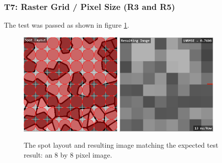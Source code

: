 \documentclass[12pt, titlepage]{article}
\begin{document}
\subsubsection{T7: Raster Grid / Pixel Size (R3 and R5)}
The test was passed as shown in figure \ref{fig_t7}.
\begin{figure}[h!]
  \begin{center}
   \includegraphics[width=5cm]{t7a.png}
   \includegraphics[width=5cm]{t7b.png}
  \caption{The spot layout and resulting image matching the expected test result: an 8 by 8 pixel image.}
  \label{fig_t7} 
  \end{center}
\end{figure}
\end{document}
